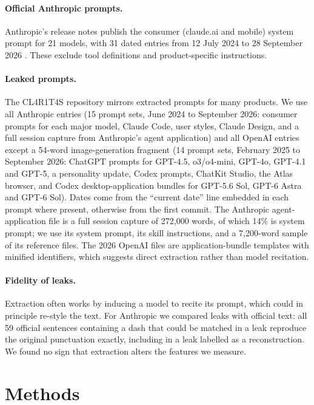 \documentclass[11pt]{article}
\begin{document}
\paragraph{Official Anthropic prompts.} Anthropic's release notes publish the consumer (claude.ai and mobile) system prompt for 21 models, with 31 dated entries from 12 July 2024 to 28 September 2026 \citep{anthropic2026sysprompts}. These exclude tool definitions and product-specific instructions.

\paragraph{Leaked prompts.} The CL4R1T4S repository \citep{cl4r1t4s} mirrors extracted prompts for many products. We use all Anthropic entries (15 prompt sets, June 2024 to September 2026: consumer prompts for each major model, Claude Code, user styles, Claude Design, and a full session capture from Anthropic's agent application) and all OpenAI entries except a 54-word image-generation fragment (14 prompt sets, February 2025 to September 2026: ChatGPT prompts for GPT-4.5, o3/o4-mini, GPT-4o, GPT-4.1 and GPT-5, a personality update, Codex prompts, ChatKit Studio, the Atlas browser, and Codex desktop-application bundles for GPT-5.6 Sol, GPT-6 Astra and GPT-6 Sol). Dates come from the ``current date'' line embedded in each prompt where present, otherwise from the first commit. The Anthropic agent-application file is a full session capture of 272{,}000 words, of which 14\% is system prompt; we use its system prompt, its skill instructions, and a 7{,}200-word sample of its reference files. The 2026 OpenAI files are application-bundle templates with minified identifiers, which suggests direct extraction rather than model recitation.

\paragraph{Fidelity of leaks.} Extraction often works by inducing a model to recite its prompt, which could in principle re-style the text. For Anthropic we compared leaks with official text: all 59 official sentences containing a dash that could be matched in a leak reproduce the original punctuation exactly, including in a leak labelled as a reconstruction. We found no sign that extraction alters the features we measure.

\section{Methods}
\label{sec:methods}
\end{document}

